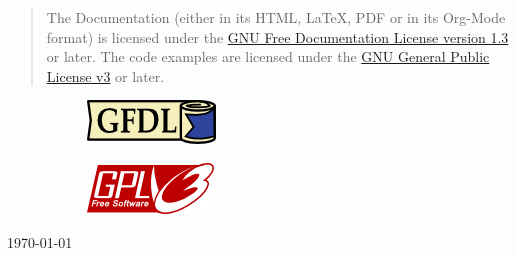 \begin{titlepage}
	\begin{center}
		\vspace{.5cm}

		\begin{quote}
			{ \small
				The Documentation (either in its HTML, \LaTeX, PDF or in its Org-Mode format) is licensed under the
				\href{https://www.gnu.org/licenses/fdl-1.3.txt}{GNU Free Documentation License version 1.3}
				or later.  The code examples are licensed under the
				\href{https://www.gnu.org/licenses/gpl-3.0.txt}{GNU General Public License v3}
				or later.
			}
		\end{quote}

		\begin{figure}[!hbt]
			\centering
			\begin{subfigure}{0.49\textwidth}
				\centering
				\includegraphics[height=.5cm]{images/gfdl.png}
				\label{fig:left1}
			\end{subfigure}
			\begin{subfigure}{0.49\textwidth}
				\centering
				\includegraphics[height=.5cm]{images/gplv3.png}
				\label{fig:right1}
			\end{subfigure}
			\label{fig:combined1}
		\end{figure}

		\vspace{.2cm}


		{\large \date \to \today}
	\end{center}
\end{titlepage}

\restoregeometry
